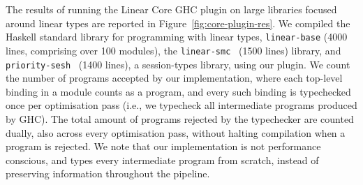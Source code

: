\documentclass[acmsmall,review,anonymous,screen]{acmart}
\begin{document}
%
%
%
%


The results of running the Linear Core GHC plugin on large 
libraries focused around linear types are reported in
Figure~\ref{fig:core-plugin-res}.
%
%
We compiled the Haskell standard library for programming with linear types,
\texttt{linear-base} (4000 lines, comprising over 100 modules), the
\texttt{linear-smc}~\cite{10.1145/3471874.3472980} (1500 lines) library, and
\texttt{priority-sesh}~\cite{10.1145/3471874.3472979} (1400 lines), a
session-types library, using our plugin.
%
We count the number of programs accepted by our implementation, where
each top-level binding in a module counts as a program, and every such
binding is typechecked once per optimisation pass (i.e., we typecheck
all intermediate programs produced by GHC). The total amount of programs
rejected by the typechecker are counted dually, also across every optimisation
pass, without halting compilation when a program is rejected. We note that our
implementation is not performance conscious, and types every intermediate
program from scratch, instead of preserving information throughout the
pipeline.
\end{document}
